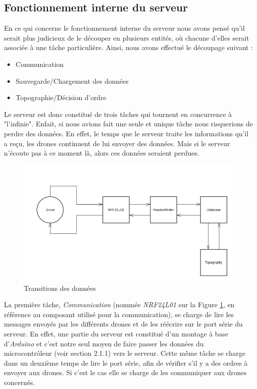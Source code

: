 \documentclass[a4paper,10pt]{report}
\begin{document}
      \subsection{Fonctionnement interne du serveur}
	En ce qui concerne le fonctionnement interne du serveur nous avons 
pensé qu'il serait plus judicieux de le découper en plusieurs entités, où 
chacune d'elles serait associée à une tâche particulière. Ainsi, nous avons 
effectué le découpage suivant :

\begin{itemize}
  \item Communication
  \item Sauvegarde/Chargement des données
  \item Topographie/Décision d'ordre
\end{itemize}
	Le serveur est donc constitué de trois tâches qui tournent en 
concurrence à "l'infinie". Enfait, si nous avions fait une seule et unique 
tâche nous risquerions de perdre des données. En effet, le temps que le serveur 
traite les informations qu'il a reçu, les drones continuent de lui envoyer des 
données. Mais si le serveur n'écoute pas à ce moment là, alors ces données 
seraient perdues.
	

	\begin{figure}[htbp]
	  \centering
	  \includegraphics[scale=0.45]{img/server_model.png}
	  \caption{Transitions des données}
	  \label{server_model}
	\end{figure}
	
	La première tâche, \textit{Communication} (nommée \textit{NRF24L01} sur 
la Figure \ref{server_model}, en référence au composant utilisé pour la 
communication), se charge de lire les messages envoyés par les différents 
drones et de les réécrire sur le port série du serveur. En effet, une partie du 
serveur est constitué d'un montage à base d'\textit{Arduino} et c'est notre 
seul moyen de faire passer les données du microcontrôleur (voir section 2.1.1) 
vers le serveur. Cette même tâche se charge dans un deuxième temps de lire le 
port série, afin de vérifier s'il y a des ordres à envoyer aux drones. Si c'est 
le cas elle se charge de les communiquer aux drones concernés.
\end{document}
